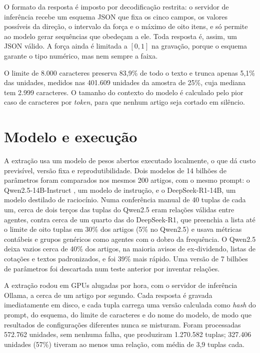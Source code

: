 O formato da resposta é imposto por decodificação restrita: o servidor de inferência recebe um esquema
JSON que fixa os cinco campos, os valores possíveis da direção, o intervalo da força e o máximo de oito
itens, e só permite ao modelo gerar sequências que obedeçam a ele. Toda resposta é, assim, um JSON
válido. A força ainda é limitada a $[0,1]$ na gravação, porque o esquema garante o tipo numérico, mas
nem sempre a faixa.

O limite de 8.000 caracteres preserva 83,9\% de todo o texto e trunca apenas 5,1\% das unidades,
medidos nas 401.609 unidades da amostra de 25\%, cuja mediana tem 2.999 caracteres. O tamanho do contexto do
modelo é calculado pelo pior caso de caracteres por \emph{token}, para que nenhum artigo seja cortado em
silêncio.

\section{Modelo e execução}
\label{sec:modelo-llm}

A extração usa um modelo de pesos abertos executado localmente, o que dá custo previsível, versão fixa e
reprodutibilidade. Dois modelos de 14 bilhões de parâmetros foram comparados nos mesmos 200 artigos, com
o mesmo prompt: o Qwen2.5-14B-Instruct \citep{qwen2024}, um modelo de instrução, e o DeepSeek-R1-14B, um
modelo destilado de raciocínio. Numa conferência manual de 40 tuplas de cada um, cerca de dois terços das
tuplas do Qwen2.5 eram relações válidas entre agentes, contra cerca de um quarto das do DeepSeek-R1, que
preenchia a lista até o limite de oito tuplas em 30\% dos artigos (5\% no Qwen2.5) e usava métricas
contábeis e grupos genéricos como agentes com o dobro da frequência. O Qwen2.5 deixa vazios cerca de 40\%
dos artigos, na maioria avisos de ex-dividendo, listas de cotações e textos padronizados, e foi 39\% mais
rápido. Uma versão de 7 bilhões de parâmetros foi descartada num teste anterior por inventar relações.

A extração rodou em GPUs alugadas por hora, com o servidor de inferência Ollama, a cerca de um artigo por
segundo. Cada resposta é gravada imediatamente em disco, e cada tupla carrega uma versão calculada como
\emph{hash} do prompt, do esquema, do limite de caracteres e do nome do modelo, de modo que resultados de
configurações diferentes nunca se misturam. Foram processadas 572.762 unidades, sem nenhuma falha, que
produziram 1.270.582 tuplas; 327.406 unidades (57\%) tiveram ao menos uma relação, com média de 3,9 tuplas
cada.

